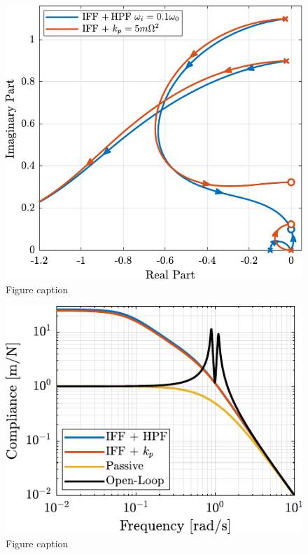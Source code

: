 \documentclass{ISMA_USD2020}
\begin{document}
\begin{figure}[htbp]
\centering
\includegraphics[scale=1]{figs/comp_root_locus.pdf}
\caption{\label{fig:comp_root_locus}Figure caption}
\end{figure}

\begin{figure}[htbp]
\centering
\includegraphics[scale=1]{figs/comp_compliance.pdf}
\caption{\label{fig:comp_compliance}Figure caption}
\end{figure}
\end{document}

